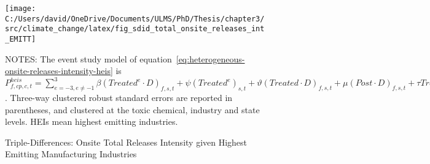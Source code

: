 \begin{figure}[H]
    \centering
    \texttt{[image: C:/Users/david/OneDrive/Documents/ULMS/PhD/Thesis/chapter3/src/climate\_change/latex/fig\_sdid\_total\_onsite\_releases\_int\_EMITT]}
    \caption{Triple-Differences: Onsite Total Releases Intensity given Highest Emitting Manufacturing Industries}
    \label{fig:heterogeneous-onsite-releases-intensity-emitt}
    \begin{minipage}{\columnwidth}
        \vspace{0.05in}
        \tiny NOTES: The event study model of equation~\ref{eq:heterogeneous-onsite-releases-intensity-heis} is $P_{f,cp,c,t}^{heis} = \sum_{{e = -3},{e \neq -1}}^{3} \beta (Treated^{e} \cdot D)_{f,s,t} + \psi (Treated^{e})_{s,t} + \vartheta (Treated \cdot D)_{f,s,t} + \mu (Post \cdot D)_{f,s,t} + \tau Treated_{s,t} + \rho D_{f,s,t} + \alpha Post_{t} + \delta X_{v,c,t-1} + \omega F_{f,t} + \lambda_{t} + \gamma_{f} + \phi_{cp} + \zeta_{c} + \eta_{c,t} + \theta_{cp,t} + \varepsilon_{f,cp,c,t}$. Three-way clustered robust standard errors are reported in parentheses, and clustered at the toxic chemical, industry and state levels. HEIs mean highest emitting industries.
    \end{minipage}
\end{figure}